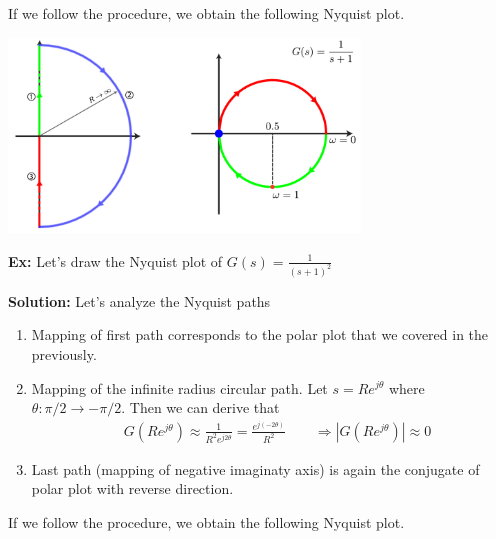 \documentclass{article}
\begin{document}
If we follow the procedure, we obtain the following Nyquist plot. 

\vspace{6 pt}

  \begin{minipage}[h]{1\linewidth}
    \begin{center}
      \includegraphics[width=0.7\textwidth]{ex2}
    \end{center}
  \end{minipage}

\vspace{6 pt}

\textbf{Ex:} Let's draw the Nyquist plot of 
$G(s) = \frac{1}{(s+1)^2}$ 

\textbf{Solution:} Let's analyze the Nyquist paths
%
\begin{enumerate}
  \item Mapping of first path corresponds to the polar plot that we covered in the previously. 
%
  \item Mapping of the infinite radius circular path. Let  $s = R e^{j \theta}$ where $\theta : \pi/2 \to -\pi/2$.  Then 
   we can derive that  
   \begin{align*}
     & G \left( R e^{j \theta} \right)  \approx \frac{1}{R^2 e^{j
       2 \theta}} = \frac{e^{j (-2 \theta)}}{R^2}
       \quad \quad
    \Rightarrow | G \left( R e^{j \theta} \right) | \approx 0
   \end{align*}
   \item Last path (mapping of negative imaginaty axis) is again
   the conjugate of polar plot with reverse direction. 
\end{enumerate}

If we follow the procedure, we obtain the following Nyquist plot. 

\vspace{6 pt}
\end{document}
